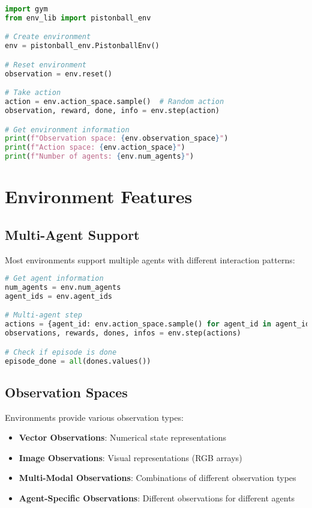 \begin{lstlisting}[language=python, caption=Standard Environment Interface]
import gym
from env_lib import pistonball_env

# Create environment
env = pistonball_env.PistonballEnv()

# Reset environment
observation = env.reset()

# Take action
action = env.action_space.sample()  # Random action
observation, reward, done, info = env.step(action)

# Get environment information
print(f"Observation space: {env.observation_space}")
print(f"Action space: {env.action_space}")
print(f"Number of agents: {env.num_agents}")
\end{lstlisting}

\section{Environment Features}

\subsection{Multi-Agent Support}

Most environments support multiple agents with different interaction patterns:

\begin{lstlisting}[language=python, caption=Multi-Agent Usage]
# Get agent information
num_agents = env.num_agents
agent_ids = env.agent_ids

# Multi-agent step
actions = {agent_id: env.action_space.sample() for agent_id in agent_ids}
observations, rewards, dones, infos = env.step(actions)

# Check if episode is done
episode_done = all(dones.values())
\end{lstlisting}

\subsection{Observation Spaces}

Environments provide various observation types:

\begin{itemize}
    \item \textbf{Vector Observations}: Numerical state representations
    \item \textbf{Image Observations}: Visual representations (RGB arrays)
    \item \textbf{Multi-Modal Observations}: Combinations of different observation types
    \item \textbf{Agent-Specific Observations}: Different observations for different agents
\end{itemize}

